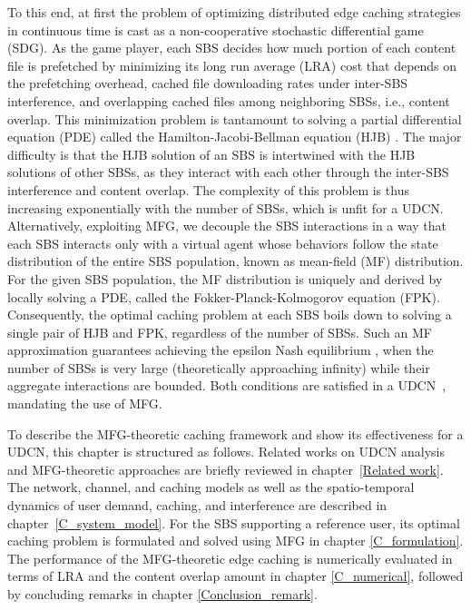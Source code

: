 \documentclass{book}
\begin{document}
To this end, at first the problem of optimizing distributed edge caching strategies in continuous time is cast as a non-cooperative stochastic differential game (SDG). As the game player, each SBS decides how much portion of each content file is prefetched by minimizing its long run average (LRA) cost that depends on the prefetching overhead, cached file downloading rates under inter-SBS interference, and overlapping cached files among neighboring SBSs, i.e., content overlap. This minimization problem is tantamount to solving a partial differential equation (PDE) called the Hamilton-Jacobi-Bellman equation (HJB) \cite{exist_HJBsol1}. The major difficulty is that the HJB solution of an SBS is intertwined with the HJB solutions of other SBSs, as they interact with each other through the inter-SBS interference and content overlap. The complexity of this problem is thus increasing exponentially with the number of SBSs, which is unfit for a UDCN. Alternatively, exploiting MFG, we decouple the SBS interactions in a way that each SBS interacts only with a virtual agent whose behaviors follow the state distribution of the entire SBS population, known as mean-field (MF) distribution. For the given SBS population, the MF distribution is uniquely and derived by locally solving a PDE, called the Fokker-Planck-Kolmogorov equation (FPK). Consequently, the optimal caching problem at each SBS boils down to solving a single pair of HJB and FPK, regardless of the number of SBSs. Such an MF approximation guarantees achieving the epsilon Nash equilibrium \cite{MF_Caine1,EV_JSAC}, when the number of SBSs is very large (theoretically approaching infinity) while their aggregate interactions are bounded. Both conditions are satisfied in a UDCN~\cite{ICC,TVT_MFCaching}, mandating the use of MFG.
 

To describe the MFG-theoretic caching framework and show its effectiveness for a UDCN, this chapter is structured as follows. Related works on UDCN analysis and MFG-theoretic approaches are briefly reviewed in chapter~\ref{Related work}. The network, channel, and caching models as well as the spatio-temporal dynamics of user demand, caching, and interference are described in chapter~\ref{C_system_model}. For the SBS supporting a reference user, its optimal caching problem is formulated and solved using MFG in chapter \ref{C_formulation}. The performance of the MFG-theoretic edge caching is numerically evaluated in terms of LRA and the content overlap amount in chapter \ref{C_numerical}, followed by concluding remarks in chapter \ref{Conclusion_remark}.
\end{document}
